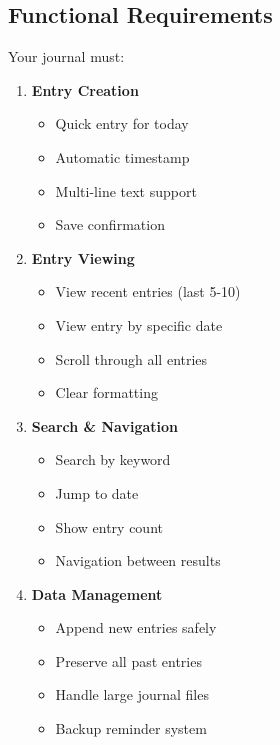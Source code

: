 \documentclass[
  letterpaper,
  DIV=11,
  numbers=noendperiod,
  oneside]{scrreprt}
\providecommand{\tightlist}{%
  \setlength{\itemsep}{0pt}\setlength{\parskip}{0pt}}\usepackage{longtable,booktabs,array}
\begin{document}
\subsection{Functional Requirements}\label{functional-requirements-6}

Your journal must:

\begin{enumerate}
\def\labelenumi{\arabic{enumi}.}
\tightlist
\item
  \textbf{Entry Creation}

  \begin{itemize}
  \tightlist
  \item
    Quick entry for today
  \item
    Automatic timestamp
  \item
    Multi-line text support
  \item
    Save confirmation
  \end{itemize}
\item
  \textbf{Entry Viewing}

  \begin{itemize}
  \tightlist
  \item
    View recent entries (last 5-10)
  \item
    View entry by specific date
  \item
    Scroll through all entries
  \item
    Clear formatting
  \end{itemize}
\item
  \textbf{Search \& Navigation}

  \begin{itemize}
  \tightlist
  \item
    Search by keyword
  \item
    Jump to date
  \item
    Show entry count
  \item
    Navigation between results
  \end{itemize}
\item
  \textbf{Data Management}

  \begin{itemize}
  \tightlist
  \item
    Append new entries safely
  \item
    Preserve all past entries
  \item
    Handle large journal files
  \item
    Backup reminder system
  \end{itemize}
\end{enumerate}
\end{document}
